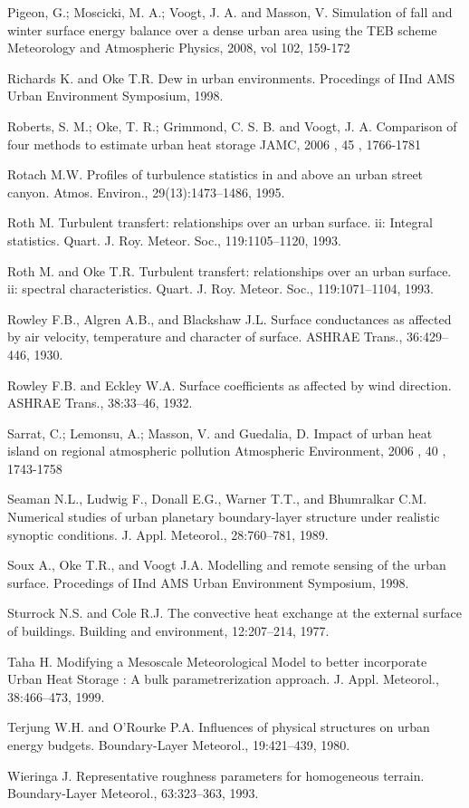 \begin{description}
\item
Pigeon, G.; Moscicki, M. A.; Voogt, J. A. and Masson, V. Simulation of fall and winter surface energy balance over a dense urban area using the TEB scheme Meteorology and Atmospheric Physics, 2008, vol 102, 159-172


\item
 Richards K. and Oke T.R. Dew in urban environments. Procedings of IInd AMS Urban Environment
Symposium, 1998.
\item
Roberts, S. M.; Oke, T. R.; Grimmond, C. S. B. and Voogt, J. A. Comparison of four methods to estimate urban heat storage JAMC, 2006 , 45 , 1766-1781 

\item
 Rotach M.W. Profiles of turbulence statistics in and above an urban street canyon. Atmos. Environ.,
29(13):1473–1486, 1995.
\item
 Roth M. Turbulent transfert: relationships over an urban surface. ii: Integral statistics. Quart. J. Roy.
Meteor. Soc., 119:1105–1120, 1993.
\item
 Roth M. and Oke T.R. Turbulent transfert: relationships over an urban surface. ii: spectral characteristics.
Quart. J. Roy. Meteor. Soc., 119:1071–1104, 1993.
\item
 Rowley F.B., Algren A.B., and Blackshaw J.L. Surface conductances as affected by air velocity,
temperature and character of surface. ASHRAE Trans., 36:429–446, 1930.
\item
 Rowley F.B. and Eckley W.A. Surface coefficients as affected by wind direction. ASHRAE Trans.,
38:33–46, 1932.
\item
Sarrat, C.; Lemonsu, A.; Masson, V. and Guedalia, D. Impact of urban heat island on regional atmospheric pollution Atmospheric Environment, 2006 , 40 , 1743-1758

\item
 Seaman N.L., Ludwig F., Donall E.G., Warner T.T., and Bhumralkar C.M. Numerical studies
of urban planetary boundary-layer structure under realistic synoptic conditions. J. Appl. Meteorol.,
28:760–781, 1989.
\item
 Soux A., Oke T.R., and Voogt J.A. Modelling and remote sensing of the urban surface. Procedings
of IInd AMS Urban Environment Symposium, 1998.
\item
 Sturrock N.S. and Cole R.J. The convective heat exchange at the external surface of buildings. Building
and environment, 12:207–214, 1977.
\item
 Taha H. Modifying a Mesoscale Meteorological Model to better incorporate Urban Heat Storage : A
bulk parametrerization approach. J. Appl. Meteorol., 38:466–473, 1999.
\item
 Terjung W.H. and O’Rourke P.A. Influences of physical structures on urban energy budgets.
Boundary-Layer Meteorol., 19:421–439, 1980.
\item
 Wieringa J. Representative roughness parameters for homogeneous terrain. Boundary-Layer Meteorol.,
63:323–363, 1993.

\end{description}

